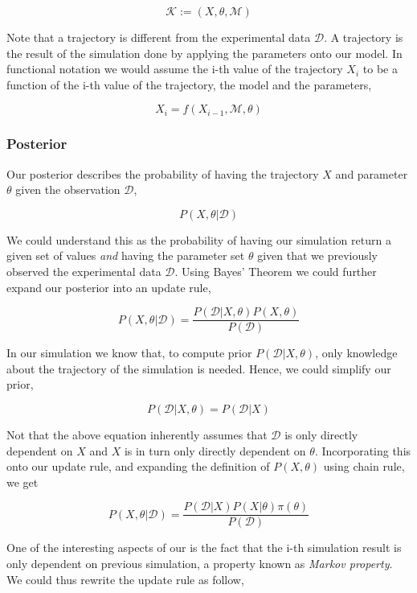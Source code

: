 \documentclass[12pt, oneside]{article}
\begin{document}
$$
\mathcal{K} := (X, \theta, \mathcal{M})
$$

Note that a trajectory is different from the experimental data $\mathcal{D}$. A trajectory is the result of the simulation done by applying the parameters onto our model. In functional notation we would assume the i-th value of the trajectory $X_i$ to be a function of the i-th value of the trajectory, the model and the parameters,

$$
X_i = f(X_{i - 1}, \mathcal{M}, \theta)
$$

\subsubsection{Posterior}

Our posterior describes the probability of having the trajectory $X$ and parameter $\theta$ given the observation $\mathcal{D}$,

$$
P(X, \theta | \mathcal{D})
$$

We could understand this as the probability of having our simulation return a given set of values \textit{and} having the parameter set $\theta$ given that we previously observed the experimental data $\mathcal{D}$. Using Bayes' Theorem we could further expand our posterior into an update rule,

$$
P(X, \theta | \mathcal{D}) = \frac{P(\mathcal{D} | X, \theta)  P(X, \theta)}{P(\mathcal{D})}
$$

In our simulation we know that, to compute prior $P(\mathcal{D} | X, \theta)$, only knowledge about the trajectory of the simulation is needed. Hence, we could simplify our prior,

$$P(\mathcal{D} | X, \theta) = P(\mathcal{D} | X)$$

Not that the above equation inherently assumes that $\mathcal{D}$ is only directly dependent on $X$ and $X$ is in turn only directly dependent on $\theta$. Incorporating this onto our update rule, and expanding the definition of $P(X, \theta)$ using chain rule, we get

$$
P(X, \theta | \mathcal{D}) = \frac{P(\mathcal{D} | X)  P(X | \theta) \pi(\theta)}{P(\mathcal{D})}
$$

One of the interesting aspects of our is the fact that the i-th simulation result is only dependent on previous simulation, a property known as \textit{Markov property}. We could thus rewrite the update rule as follow,

\end{document}
